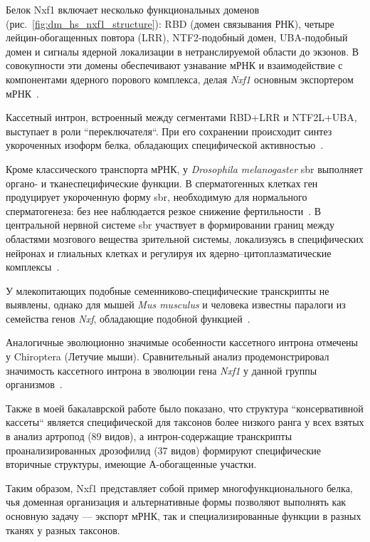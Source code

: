 Белок Nxf1 включает несколько функциональных доменов (рис.~\ref{fig:dm_hs_nxf1_structure}): RBD (домен связывания РНК), четыре лейцин-обогащенных повтора (LRR), NTF2-подобный домен, UBA-подобный домен и сигналы ядерной локализации в нетранслируемой области до экзонов.
В совокупности эти домены обеспечивают узнавание мРНК и взаимодействие с компонентами ядерного порового комплекса, делая \textit{Nxf1} основным экспортером мРНК~\cite{Herold2000,Mamon2013}.

Кассетный интрон, встроенный между сегментами RBD+LRR и NTF2L+UBA, выступает в роли ``переключателя``.
При его сохранении происходит синтез укороченных изоформ белка, обладающих специфической активностью~\cite{Mamon2013}.

Кроме классического транспорта мРНК, у \textit{Drosophila melanogaster} sbr выполняет органо- и тканеспецифические функции.
В сперматогенных клетках ген продуцирует укороченную форму sbr, необходимую для нормального сперматогенеза: без нее наблюдается резкое снижение фертильности~\cite{Ginanova2016}.
В центральной нервной системе sbr участвует в формировании границ между областями мозгового вещества зрительной системы, локализуясь в специфических нейронах и глиальных клетках и регулируя их ядерно–цитоплазматические комплексы~\cite{Mamon2021}.

У млекопитающих подобные семенниково-специфические транскрипты не выявлены, однако для мышей \textit{Mus musculus} и человека известны паралоги из семейства генов \textit{Nxf}, обладающие подобной функцией~\cite{Mamon2019}.

Аналогичные эволюционно значимые особенности кассетного интрона отмечены у Chiroptera (Летучие мыши).
Сравнительный анализ продемонстрировал значимость кассетного интрона в эволюции гена \textit{Nxf1} у данной группы организмов~\cite{Bondaruk2022}.

Также в моей бакалаврской работе было показано, что структура ``консервативной кассеты`` является специфической для таксонов более низкого ранга у всех взятых в анализ артропод (89 видов), а интрон-содержащие транскрипты проанализированных дрозофилид (37 видов) формируют специфические вторичные структуры, имеющие А-обогащенные участки.

Таким образом, Nxf1 представляет собой пример многофункционального белка, чья доменная организация и альтернативные формы позволяют выполнять как основную задачу — экспорт мРНК, так и специализированные функции в разных тканях у разных таксонов.
